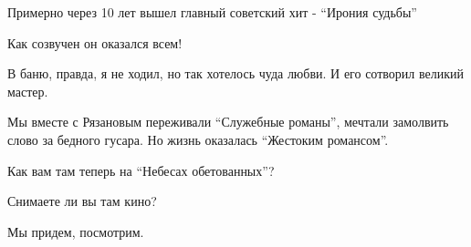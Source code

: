Примерно через 10 лет вышел главный советский хит - \enquote{Ирония судьбы}

Как созвучен он оказался всем!

В баню, правда,  я не ходил, но так  хотелось чуда любви. И его сотворил
великий мастер. 

Мы вместе с Рязановым переживали \enquote{Служебные романы},  мечтали  замолвить слово
за бедного гусара. Но жизнь оказалась \enquote{Жестоким романсом}.

Как вам там теперь на \enquote{Небесах обетованных}?

Снимаете ли вы там кино?

Мы придем, посмотрим.


